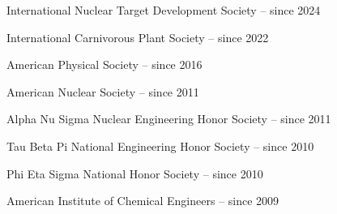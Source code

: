 \begin{list1}
\item[] International Nuclear Target Development Society  \hfill{ -- since 2024}
\item[] International Carnivorous Plant Society  \hfill{ -- since 2022}
\item[] American Physical Society  \hfill{ -- since 2016}
\item[] American Nuclear Society  \hfill{ -- since 2011}
\item[] Alpha Nu Sigma Nuclear Engineering Honor Society \hfill{-- since 2011}
\item[] Tau Beta Pi National Engineering Honor Society \hfill{-- since 2010}
\item[] Phi Eta Sigma National Honor Society \hfill{-- since 2010}
\item[] American Institute of Chemical Engineers \hfill{-- since 2009}
\end{list1}
